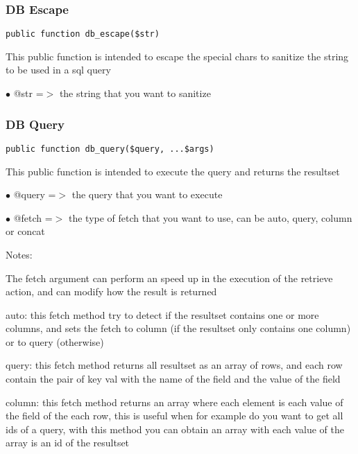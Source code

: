 \documentclass[a4paper]{article}
\begin{document}
\hypertarget{toc322}{}
\subsubsection{DB Escape}

\begin{lstlisting}
public function db_escape($str)
\end{lstlisting}

This public function is intended to escape the special chars to sanitize the string to be used
in a sql query

\begin{compactitem}
\item[\color{myblue}$\bullet$] @str =$>$ the string that you want to sanitize
\end{compactitem}

\hypertarget{toc323}{}
\subsubsection{DB Query}

\begin{lstlisting}
public function db_query($query, ...$args)
\end{lstlisting}

This public function is intended to execute the query and returns the resultset

\begin{compactitem}
\item[\color{myblue}$\bullet$] @query =$>$ the query that you want to execute
\item[\color{myblue}$\bullet$] @fetch =$>$ the type of fetch that you want to use, can be auto, query, column or concat
\end{compactitem}

Notes:

The fetch argument can perform an speed up in the execution of the retrieve action, and
can modify how the result is returned

auto: this fetch method try to detect if the resultset contains one or more columns, and
sets the fetch to column (if the resultset only contains one column) or to query (otherwise)

query: this fetch method returns all resultset as an array of rows, and each row contain the
pair of key val with the name of the field and the value of the field

column: this fetch method returns an array where each element is each value of the field of
the each row, this is useful when for example do you want to get all ids of a query, with
this method you can obtain an array with each value of the array is an id of the resultset
\end{document}
